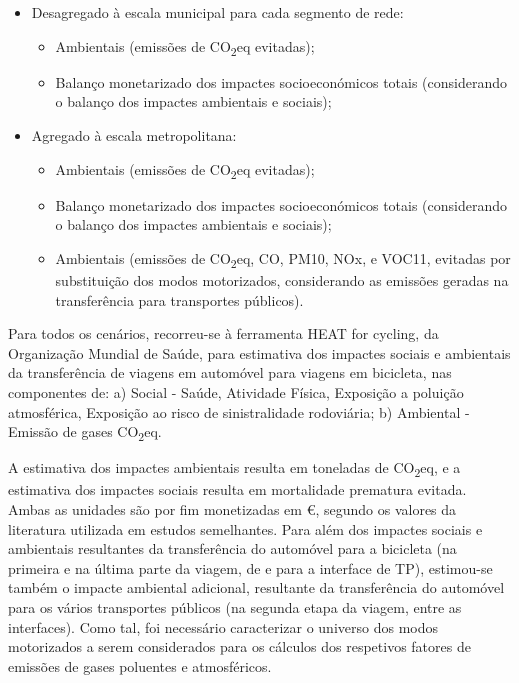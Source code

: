 \documentclass[runningheads]{llncs}
\providecommand{\tightlist}{%
  \setlength{\itemsep}{0pt}\setlength{\parskip}{0pt}}
\begin{document}
\begin{itemize}
\tightlist
\item
  Desagregado à escala municipal para cada segmento de rede:

  \begin{itemize}
  \tightlist
  \item
    Ambientais (emissões de CO\textsubscript{2}eq evitadas);
  \item
    Balanço monetarizado dos impactes socioeconómicos totais
    (considerando o balanço dos impactes ambientais e sociais);
  \end{itemize}
\item
  Agregado à escala metropolitana:

  \begin{itemize}
  \tightlist
  \item
    Ambientais (emissões de CO\textsubscript{2}eq evitadas);
  \item
    Balanço monetarizado dos impactes socioeconómicos totais
    (considerando o balanço dos impactes ambientais e sociais);
  \item
    Ambientais (emissões de CO\textsubscript{2}eq, CO, PM10, NOx, e
    VOC11, evitadas por substituição dos modos motorizados, considerando
    as emissões geradas na transferência para transportes públicos).
  \end{itemize}
\end{itemize}

Para todos os cenários, recorreu-se à ferramenta HEAT for cycling, da
Organização Mundial de Saúde, para estimativa dos impactes sociais e
ambientais da transferência de viagens em automóvel para viagens em
bicicleta, nas componentes de: a) Social - Saúde, Atividade Física,
Exposição a poluição atmosférica, Exposição ao risco de sinistralidade
rodoviária; b) Ambiental - Emissão de gases CO\textsubscript{2}eq.

A estimativa dos impactes ambientais resulta em toneladas de
CO\textsubscript{2}eq, e a estimativa dos impactes sociais resulta em
mortalidade prematura evitada. Ambas as unidades são por fim monetizadas
em €, segundo os valores da literatura utilizada em estudos semelhantes.
Para além dos impactes sociais e ambientais resultantes da transferência
do automóvel para a bicicleta (na primeira e na última parte da viagem,
de e para a interface de TP), estimou-se também o impacte ambiental
adicional, resultante da transferência do automóvel para os vários
transportes públicos (na segunda etapa da viagem, entre as interfaces).
Como tal, foi necessário caracterizar o universo dos modos motorizados a
serem considerados para os cálculos dos respetivos fatores de emissões
de gases poluentes e atmosféricos.
\end{document}
